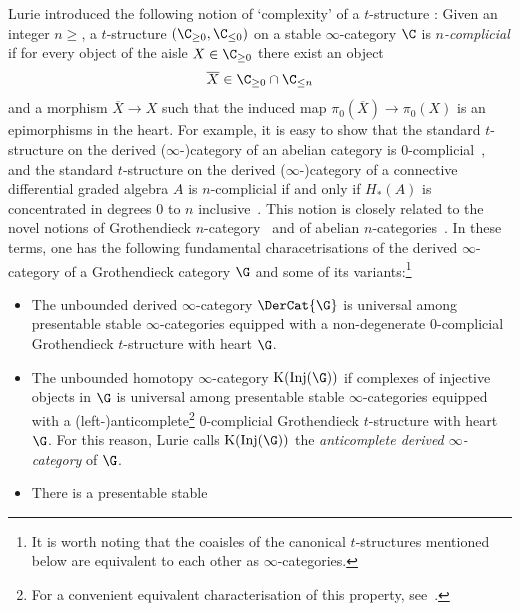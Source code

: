 \documentclass[a4paper]{amsart}
\begin{document}
\begin{remark}
  \label{rmk:complicial}
  Lurie introduced the following notion of `complexity' of a
  $t$-structure \cite[Definition~C.5.3.1]{Lur18SAG}: Given an integer $n\geq$, a
  $t$-structure $(\C_{\geq0},\C_{\leq0})$ on a stable $\infty$-category $\C$ is
  \emph{$n$-complicial} if for every object of the aisle $X\in\C_{\geq0}$ there
  exist an object
  \[
    \overline{X}\in\C_{\geq0}\cap\C_{\leq n}
  \]
  and a morphism $\overline{X}\to X$ such that the induced map
  $\pi_0(\overline{X})\to\pi_0(X)$ is an epimorphisms in the heart. For example,
  it is easy to show that the standard $t$-structure on the derived
  ($\infty$-)category of an abelian category is
  $0$-complicial~\cite[C.~5.3.2]{Lur18SAG}, and the standard $t$-structure on
  the derived ($\infty$-)category of a connective differential graded algebra
  $A$ is $n$-complicial if and only if $H_*(A)$ is concentrated in degrees $0$
  to $n$ inclusive~\cite[Example~C.5.3.5]{Lur18SAG}. This notion is
  closely related to the novel notions of Grothendieck
  $n$-category~\cite[Section~C.5.4]{Lur18SAG} and of abelian
  $n$-categories~\cite{Ste23,Moc25}. In these terms, one has the following
  fundamental characetrisations of the derived $\infty$-category of a
  Grothendieck category $\G$ and some of its variants:\footnote{It is worth
    noting that the coaisles of the canonical $t$-structures mentioned below are
    equivalent to each other as $\infty$-categories.}
  \begin{itemize}
  \item \cite[Remark~C.5.4.11]{Lur18SAG} The unbounded derived $\infty$-category
    $\DerCat{\G}$ is universal among presentable stable $\infty$-categories
    equipped with a non-de\-ge\-ne\-ra\-te $0$-complicial Groth\-en\-dieck
    $t$-structure with heart $\G$.
  \item \cite[Proposition~C.5.20 and~Theorem C.5.8.8]{Lur18SAG} The unbounded
    homotopy $\infty$-ca\-te\-go\-ry $\operatorname{K}(\operatorname{Inj}(\G))$ if
    complexes of injective objects in $\G$ is universal among presentable stable
    $\infty$-categories equipped with a  (left-)anticomplete\footnote{For a convenient
      equivalent characterisation of this property, see~\cite[Corollary
      C.5.5.10]{Lur18SAG}.} $0$-complicial Grothendieck $t$-structure with heart
    $\G$. For this reason, Lurie calls $\operatorname{K}(\operatorname{Inj}(\G))$
    the \emph{anticomplete derived $\infty$-category} of $\G$.
\item \cite[Corollary~C.5.9.7]{Lur18SAG} There is a presentable stable

\end{itemize}
\end{remark}
\end{document}
